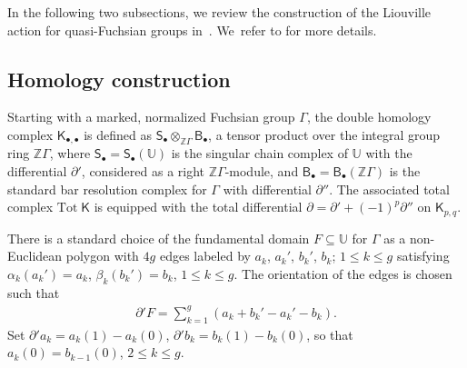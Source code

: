 \documentclass[pdftex]{sigma}%
\numberwithin{equation}{section}
\newcommand{\pa}{\partial}
\begin{document}
In the following two subsections, we review the construction of the Liouville action for quasi-Fuchsian groups in~\cite{2}. We~refer to \cite[Section~2]{2} for more details.

\subsection{Homology construction}

Starting with a marked, normalized Fuchsian group $\Gamma$, the double homology complex $\mathsf{K}_{\bullet, \bullet}$ is defined as $\mathsf{S}_{\bullet}\otimes_{\mathbb{Z}\Gamma}\mathsf{B}_{\bullet}$, a tensor product over the integral group ring $\mathbb{Z}\Gamma$, where $\mathsf{S}_{\bullet}=\mathsf{S}_{\bullet}(\mathbb{U})$ is the singular chain complex of $\mathbb{U}$ with the differential $\partial'$, considered as a right $\mathbb{Z}\Gamma$-module, and $\mathsf{B}_{\bullet}=\mathsf{B}_{\bullet}(\mathbb{Z}\Gamma)$ is the standard bar resolution complex for $\Gamma$ with differential $\partial''$. The associated total complex $\text{Tot} \;\mathsf{K}$ is equipped with the total differential $\partial=\partial'+(-1)^p \partial''$ on $\mathsf{K}_{p,q}$.

There is a standard choice of the fundamental domain
$F\subseteq \mathbb{U}$ for $\Gamma$ as a non-Euclidean polygon with
$4g$ edges labeled by $a_k$, $a_k'$, $b_k'$, $b_k$; $1\leq k\leq g$ satisfying
$\alpha_k(a_k')=a_k$, $\beta_k(b_k')=b_k$, $1\leq k\leq g$. The orientation of the edges
is chosen such that
\begin{gather}\label{eq1}
\pa' F=\sum_{k=1}^{g}(a_k+b_k'-a_k'-b_k).
\end{gather}
Set $\pa' a_k=a_k(1)-a_k(0)$, $\pa' b_k=b_k(1)-b_k(0)$, so that $a_k(0)=b_{k-1}(0)$, $2\leq k \leq g$.
\end{document}
